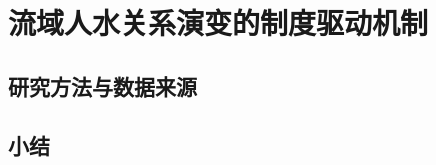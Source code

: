 \chapter{流域人\textendash{}水关系演变的制度驱动机制}\label{cha:5}


\section{研究方法与数据来源}\label{ch5:methods}






\section{小结}\label{ch5:summary}

